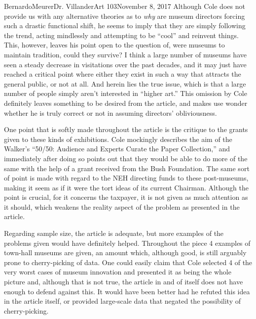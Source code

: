 \documentclass[12pt,letterpaper]{article}
\begin{document}
\begin{mla}{Bernardo}{Meurer}{Dr. Villander}{Art 103}{November 8, 2017}
        Although Cole does not provide us with any alternative theories as to \emph{why} are museum directors forcing such a drastic functional shift, he seems to imply that they are simply following the trend, acting mindlessly and attempting to be ``cool'' and reinvent things. This, however, leaves his point open to the question of, were museums to maintain tradition, could they survive? I think a large number of museums have seen a steady decrease in visitations over the past decades, and it may just have reached a critical point where either they exist in such a way that attracts the general public, or not at all. And herein lies the true issue, which is that a large number of people simply aren't interested in ``higher art.'' This omission by Cole definitely leaves something to be desired from the article, and makes use wonder whether he is truly correct or not in assuming directors' obliviousness.

        One point that is softly made throughout the article is the critique to the grants given to these kinds of exhibitions. Cole mockingly describes the aim of the Walker's ``50/50: Audience and Experts Curate
        the Paper Collection,'' and immediately after doing so points out that they would be able to do more of the same with the help of a grant received from the Bush Foundation. The same sort of point is made with regard to the NEH directing funds to these post-museums, making it seem as if it were the tort ideas of its current Chairman. Although the point is crucial, for it concerns the taxpayer, it is not given as much attention as it should, which weakens the reality aspect of the problem as presented in the article.

        Regarding sample size, the article is adequate, but more examples of the problems given would have definitely helped. Throughout the piece 4 examples of town-hall museums are given, an amount which, although good, is still arguably prone to cherry-picking of data. One could easily claim that Cole selected 4 of the very worst cases of museum innovation and presented it as being the whole picture and, although that is not true, the article in and of itself does not have enough to defend against this. It would have been better had he refuted this idea in the article itself, or provided large-scale data that negated the possibility of cherry-picking.
    

\end{mla}
\end{document}

